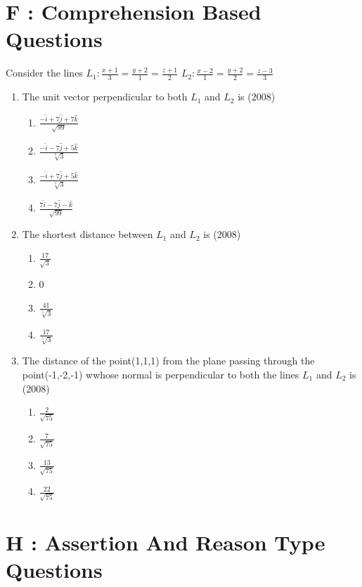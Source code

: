 \documentclass[12pt]{article}
\begin{document}
\section*{F  :  Comprehension Based Questions}

Consider the lines $L_1:\frac{x+1}{3}=\frac{y+2}{1}=\frac{z+1}{2}$ $L_2:\frac{x-2}{1}=\frac{y+2}{2}=\frac{z-3}{3}$

\begin{enumerate}
\item The unit vector perpendicular to both $L_1$ and $L_2$ is  (2008)
\begin{enumerate}
\item $\frac{-\hat{i}+7\hat{j}+7\hat{k}}{\sqrt{99}}$
\item $\frac{-\hat{i}-7\hat{j}+5\hat{k}}{\sqrt[5]{3}}$
\item $\frac{-\hat{i}+7\hat{j}+5\hat{k}}{\sqrt[5]{3}}$
\item $\frac{7\hat{i}-7\hat{j}-\hat{k}}{\sqrt{99}}$
\end{enumerate}
\item The shortest distance between $L_1$ and $L_2$ is  (2008)
\begin{enumerate}
\item $\frac{17}{\sqrt{3}}$ 
\item 0
\item $\frac{41}{\sqrt[5]{3}}$ 
\item $\frac{17}{\sqrt[5]{3}}$ 
\end{enumerate}
\item The distance of the point(1,1,1) from the plane passing through the point(-1,-2,-1) wwhose normal is perpendicular to both the lines $L_1$ and $L_2$ is  (2008)
\begin{enumerate}
\item  $\frac{2}{\sqrt{75}}$
\item  $\frac{7}{\sqrt{75}}$  
\item  $\frac{13}{\sqrt{75}}$ 
\item  $\frac{22}{\sqrt{75}}$ 
\end{enumerate}
\end{enumerate}

\section*{H   :  Assertion And Reason Type Questions}
\end{document}

